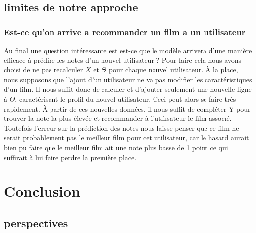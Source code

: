 \documentclass[a4paper,10pt]{article}
\begin{document}
\subsection{limites de notre approche} 
\subsubsection{Est-ce qu'on arrive a recommander un film a un utilisateur}
Au final une question intéressante est est-ce que le modèle arrivera d'une manière efficace à prédire les notes d'un nouvel utilisateur ? Pour faire cela nous avons
choisi de ne pas recalculer $X$ et $\Theta$ pour chaque nouvel utilisateur. À la place, nous supposons que l'ajout d'un utilisateur ne va pas modifier
les caractéristiques d'un film. Il nous suffit donc de calculer et d'ajouter seulement une nouvelle ligne à $\Theta$, caractérisant le profil du nouvel utilisateur. Ceci peut alors se faire très rapidement. À partir de ces nouvelles données, il nous suffit de compléter Y pour trouver la note la plus élevée et recommander à l'utilisateur le film associé. 
Toutefois l'erreur sur la prédiction des notes nous laisse penser que ce film ne serait probablement pas le meilleur film pour cet utilisateur, car le hasard aurait bien pu faire que le meilleur film ait une note plus basse de 1 point ce qui suffirait à lui faire perdre la première place.

\section{Conclusion}

\subsection{perspectives}
\end{document}
